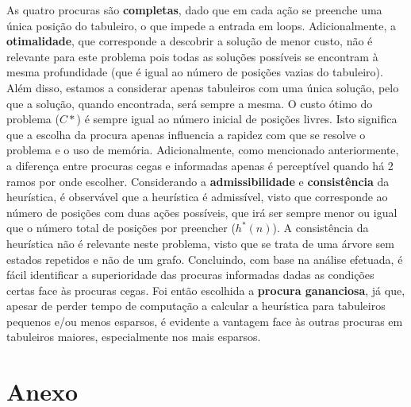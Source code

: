 \documentclass[12pt,a4paper]{article}
\begin{document}
As quatro procuras são \textbf{completas}, dado que em cada ação se preenche uma única posição do tabuleiro,
o que impede a entrada em loops.
Adicionalmente, a \textbf{otimalidade}, que corresponde a descobrir a solução de menor custo,
não é relevante para este problema pois todas as soluções possíveis se encontram à mesma profundidade
(que é igual ao número de posições vazias do tabuleiro).
Além disso, estamos a considerar apenas tabuleiros com uma única solução,
pelo que a solução, quando encontrada, será sempre a mesma.
O custo ótimo do problema (\(C*\)) é sempre igual ao número inicial de posições livres.
Isto significa que a escolha da procura apenas influencia a rapidez com que se resolve o problema e o uso de memória.
Adicionalmente, como mencionado anteriormente, a diferença entre procuras cegas e informadas apenas é perceptível quando
há 2 ramos por onde escolher.
Considerando a \textbf{admissibilidade} e \textbf{consistência} da heurística, é observável que
a heurística é admissível, visto que corresponde ao número de posições com duas ações possíveis, que
irá ser sempre menor ou igual que o número total de posições por preencher (\(h^*(n)\)).
A consistência da heurística não é relevante neste problema, visto que se trata de uma árvore sem estados repetidos e não
de um grafo.
Concluindo, com base na análise efetuada, é fácil identificar a superioridade das procuras informadas dadas as
condições certas face às procuras cegas. Foi então escolhida a \textbf{procura gananciosa}, já que,
apesar de perder tempo de computação a calcular a heurística para tabuleiros pequenos e/ou menos esparsos,
é evidente a vantagem face às outras procuras em tabuleiros maiores, especialmente nos mais
esparsos.

\clearpage

\section*{Anexo}
\end{document}
